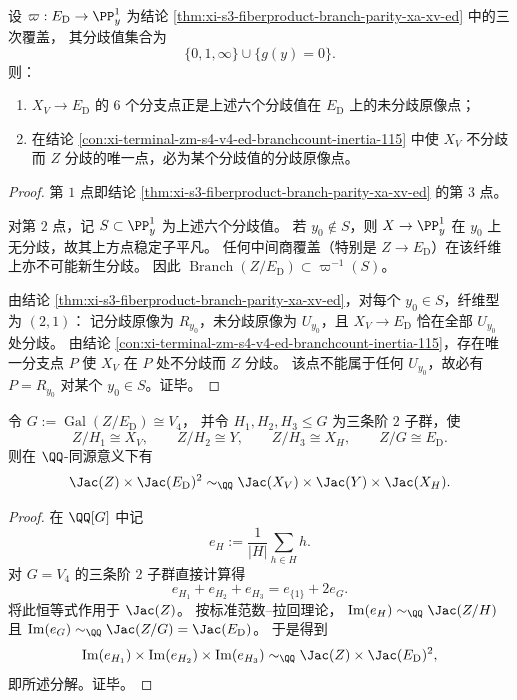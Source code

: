 \begin{conclusion}\label{con:xi-terminal-zm-s4-v4-ed-seventh-branchpoint-cubic-ramified-preimage}
设 \(\varpi:E_{\mathrm D}\to\PP^1_y\) 为结论
\ref{thm:xi-s3-fiberproduct-branch-parity-xa-xv-ed} 中的三次覆盖，
其分歧值集合为
\[
\{0,1,\infty\}\cup\{g(y)=0\}.
\]
则：
\begin{enumerate}
  \item \(X_V\to E_{\mathrm D}\) 的 \(6\) 个分支点正是上述六个分歧值在 \(E_{\mathrm D}\) 上的未分歧原像点；
  \item 在结论 \ref{con:xi-terminal-zm-s4-v4-ed-branchcount-inertia-115} 中使 \(X_V\) 不分歧而 \(Z\) 分歧的唯一点，必为某个分歧值的分歧原像点。
\end{enumerate}
\end{conclusion}
\begin{proof}
第 \(1\) 点即结论 \ref{thm:xi-s3-fiberproduct-branch-parity-xa-xv-ed} 的第 \(3\) 点。

对第 \(2\) 点，记 \(S\subset\PP^1_y\) 为上述六个分歧值。
若 \(y_0\notin S\)，则 \(X\to\PP^1_y\) 在 \(y_0\) 上无分歧，故其上方点稳定子平凡。
任何中间商覆盖（特别是 \(Z\to E_{\mathrm D}\)）在该纤维上亦不可能新生分歧。
因此 \(\operatorname{Branch}(Z/E_{\mathrm D})\subset\varpi^{-1}(S)\)。

由结论 \ref{thm:xi-s3-fiberproduct-branch-parity-xa-xv-ed}，对每个 \(y_0\in S\)，纤维型为 \((2,1)\)：
记分歧原像为 \(R_{y_0}\)，未分歧原像为 \(U_{y_0}\)，且
\(
X_V\to E_{\mathrm D}
\)
恰在全部 \(U_{y_0}\) 处分歧。
由结论 \ref{con:xi-terminal-zm-s4-v4-ed-branchcount-inertia-115}，存在唯一分支点 \(P\) 使 \(X_V\) 在 \(P\) 处不分歧而 \(Z\) 分歧。
该点不能属于任何 \(U_{y_0}\)，故必有 \(P=R_{y_0}\) 对某个 \(y_0\in S\)。证毕。
\end{proof}

\begin{conclusion}\label{con:xi-terminal-zm-s4-v4-ed-kanirosen-jacz-decomposition}
令 \(G:=\operatorname{Gal}(Z/E_{\mathrm D})\cong V_4\)，
并令 \(H_1,H_2,H_3\le G\) 为三条阶 \(2\) 子群，使
\[
Z/H_1\cong X_V,\qquad Z/H_2\cong Y,\qquad Z/H_3\cong X_H,\qquad Z/G\cong E_{\mathrm D}.
\]
则在 \(\QQ\)-同源意义下有
\[
\Jac(Z)\times \Jac(E_{\mathrm D})^{2}
\sim_{\QQ}
\Jac(X_V)\times \Jac(Y)\times \Jac(X_H).
\]
\end{conclusion}
\begin{proof}
在 \(\QQ[G]\) 中记
\[
e_H:=\frac{1}{|H|}\sum_{h\in H}h.
\]
对 \(G=V_4\) 的三条阶 \(2\) 子群直接计算得
\[
e_{H_1}+e_{H_2}+e_{H_3}=e_{\{1\}}+2e_G.
\]
将此恒等式作用于 \(\Jac(Z)\)。
按标准范数--拉回理论，
\(
\operatorname{Im}(e_H)\sim_{\QQ}\Jac(Z/H)
\) 且
\(
\operatorname{Im}(e_G)\sim_{\QQ}\Jac(Z/G)=\Jac(E_{\mathrm D})
\)。
于是得到
\[
\operatorname{Im}(e_{H_1})\times \operatorname{Im}(e_{H_2})\times \operatorname{Im}(e_{H_3})
\sim_{\QQ}
\Jac(Z)\times \Jac(E_{\mathrm D})^2,
\]
即所述分解。证毕。
\end{proof}

